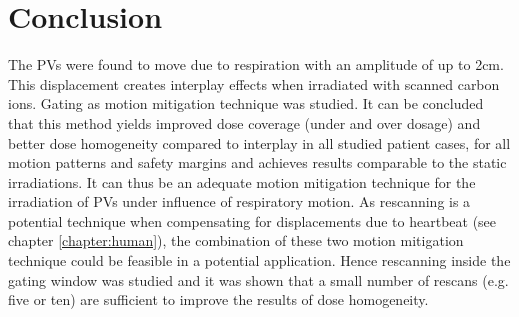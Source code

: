 \section{Conclusion}

The PVs were found to move due to respiration with an amplitude of up to 2cm. 
This displacement creates interplay effects when irradiated with scanned carbon ions. Gating as motion mitigation technique was studied. 
It can be concluded that this method yields improved dose coverage (under and over dosage) and better dose homogeneity compared to interplay 
in all studied patient cases, for all motion patterns and safety margins and achieves results comparable to the static irradiations. 
It can thus be an adequate motion mitigation technique for the irradiation of PVs under influence of respiratory motion. 
As rescanning is a potential technique when compensating for displacements due to 
heartbeat (see chapter \ref{chapter:human}), the combination of these two motion mitigation technique could be feasible in a potential 
application. Hence rescanning inside the gating window was studied and it was shown that a  small number of rescans (e.g. five or ten) are 
sufficient to improve the results of dose homogeneity. 





